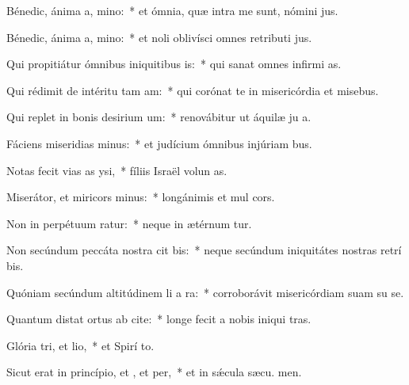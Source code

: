 \item Bénedic, ánima a, mino:~* et ómnia, quæ intra me sunt, nómini  jus.
\item Bénedic, ánima a, mino:~* et noli oblivísci omnes retributi jus.
\item Qui propitiátur ómnibus iniquitibus is:~* qui sanat omnes infirmi as.
\item Qui rédimit de intéritu tam am:~* qui corónat te in misericórdia et misebus.
\item Qui replet in bonis desirium um:~* renovábitur ut áquilæ ju a.
\item Fáciens miseridias minus:~* et judícium ómnibus injúriam bus.
\item Notas fecit vias as ysi,~* fíliis Israël volun as.
\item Miserátor, et miricors minus:~* longánimis et mul cors.
\item Non in perpétuum ratur:~* neque in ætérnum tur.
\item Non secúndum peccáta nostra cit bis:~* neque secúndum iniquitátes nostras retrí bis.
\item Quóniam secúndum altitúdinem li a ra:~* corroborávit misericórdiam suam su  se.
\item Quantum distat ortus ab cite:~* longe fecit a nobis iniqui tras.
\item Glória tri, et lio,~* et Spirí to.
\item Sicut erat in princípio, et , et per,~* et in sǽcula sæcu. men.
